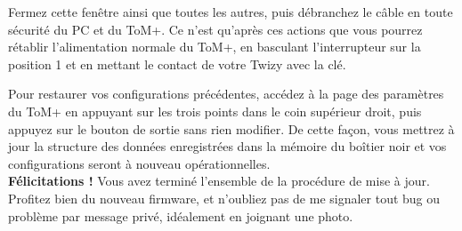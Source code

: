 Fermez cette fenêtre ainsi que toutes les autres, puis débranchez le câble en toute sécurité
du PC et du ToM+. Ce n'est qu'après ces actions que vous pourrez rétablir l'alimentation normale du ToM+,
en basculant l'interrupteur sur la position 1 et en mettant le contact de votre Twizy avec la clé.

Pour restaurer vos configurations précédentes, accédez à la page des paramètres du ToM+ en appuyant sur
les trois points dans le coin supérieur droit, puis appuyez sur le bouton de sortie sans rien
modifier. De cette façon, vous mettrez à jour la structure des données enregistrées dans la mémoire
du boîtier noir et vos configurations seront à nouveau opérationnelles.\\

\textbf{Félicitations !} Vous avez terminé l'ensemble de la procédure de mise à jour. Profitez bien du nouveau firmware,
et n'oubliez pas de me signaler tout bug ou problème par message privé, idéalement en joignant une photo.
